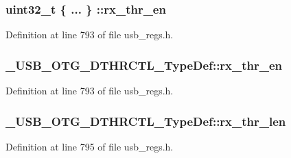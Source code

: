 \hypertarget{group___u_s_b___o_t_g___d_r_i_v_e_r_ga53b7ab3c9be975108c0ed16656cb6835}{
\subsubsection[{rx\-\_\-thr\-\_\-en}]{\setlength{\rightskip}{0pt plus 5cm}uint32\-\_\-t \{ ... \} \-::rx\-\_\-thr\-\_\-en}}\label{group___u_s_b___o_t_g___d_r_i_v_e_r_ga53b7ab3c9be975108c0ed16656cb6835}


Definition at line 793 of file usb\-\_\-regs.\-h.

\hypertarget{group___u_s_b___o_t_g___d_r_i_v_e_r_gabf30ccd0997e6301c6783cd50a71e599}{
\subsubsection[{rx\-\_\-thr\-\_\-en}]{ \-\_\-\-U\-S\-B\-\_\-\-O\-T\-G\-\_\-\-D\-T\-H\-R\-C\-T\-L\-\_\-\-Type\-Def\-::rx\-\_\-thr\-\_\-en}}\label{group___u_s_b___o_t_g___d_r_i_v_e_r_gabf30ccd0997e6301c6783cd50a71e599}


Definition at line 793 of file usb\-\_\-regs.\-h.

\hypertarget{group___u_s_b___o_t_g___d_r_i_v_e_r_ga17bd381e2313feab5337735207e2a93a}{
\subsubsection[{rx\-\_\-thr\-\_\-len}]{ \-\_\-\-U\-S\-B\-\_\-\-O\-T\-G\-\_\-\-D\-T\-H\-R\-C\-T\-L\-\_\-\-Type\-Def\-::rx\-\_\-thr\-\_\-len}}\label{group___u_s_b___o_t_g___d_r_i_v_e_r_ga17bd381e2313feab5337735207e2a93a}


Definition at line 795 of file usb\-\_\-regs.\-h.


